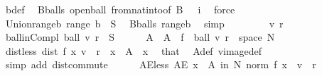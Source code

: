 \begin{isabellebody}
\ b{\isacharunderscore}{\kern0pt}def\ \isamarkupfalse%
\ B{\isacharunderscore}{\kern0pt}balls\ open{\isacharunderscore}{\kern0pt}ball\ from{\isacharunderscore}{\kern0pt}nat{\isacharunderscore}{\kern0pt}into{\isacharbrackleft}{\kern0pt}of\ {\isachardoublequoteopen}B\ {\isasymunion}\ {\isacharbraceleft}{\kern0pt}{\isacharbraceleft}{\kern0pt}{\isacharbraceright}{\kern0pt}{\isacharbraceright}{\kern0pt}{\isachardoublequoteclose}\ i{\isacharbrackright}{\kern0pt}\ \isamarkupfalse%
\ force\isanewline
\ \ \isamarkupfalse%
\ Union{\isacharunderscore}{\kern0pt}range{\isacharunderscore}{\kern0pt}b{\isacharcolon}{\kern0pt}\ {\isachardoublequoteopen}{\isasymUnion}{\isacharparenleft}{\kern0pt}range\ b{\isacharparenright}{\kern0pt}\ {\isacharequal}{\kern0pt}\ {\isacharminus}{\kern0pt}S{\isachardoublequoteclose}\ \isamarkupfalse%
\ B{\isacharunderscore}{\kern0pt}balls\ range{\isacharunderscore}{\kern0pt}b\ \isamarkupfalse%
\ simp\isanewline
\isanewline
\ \ \isacommand{{\isacharbraceleft}{\kern0pt}}\isamarkupfalse%
\isanewline
\ \ \ \ \isamarkupfalse%
\ v\ r\ \isamarkupfalse%
\ ball{\isacharunderscore}{\kern0pt}in{\isacharunderscore}{\kern0pt}Compl{\isacharcolon}{\kern0pt}\ {\isachardoublequoteopen}ball\ v\ r\ {\isasymsubseteq}\ {\isacharminus}{\kern0pt}S{\isachardoublequoteclose}\isanewline
\ \ \ \ \isamarkupfalse%
\ A\ \ {\isachardoublequoteopen}A\ {\isacharequal}{\kern0pt}\ f\ {\isacharminus}{\kern0pt}{\isacharbackquote}{\kern0pt}\ ball\ v\ r\ {\isasyminter}\ space\ N{\isachardoublequoteclose}\isanewline
\ \ \ \ \isamarkupfalse%
\ dist{\isacharunderscore}{\kern0pt}less{\isacharcolon}{\kern0pt}\ {\isachardoublequoteopen}dist\ {\isacharparenleft}{\kern0pt}f\ x{\isacharparenright}{\kern0pt}\ v\ {\isacharless}{\kern0pt}\ r{\isachardoublequoteclose}\ \ {\isachardoublequoteopen}x\ {\isasymin}\ A{\isachardoublequoteclose}\ \ x\ \isamarkupfalse%
\ that\ \isamarkupfalse%
\ A{\isacharunderscore}{\kern0pt}def\ vimage{\isacharunderscore}{\kern0pt}def\ \isamarkupfalse%
\ {\isacharparenleft}{\kern0pt}simp\ add{\isacharcolon}{\kern0pt}\ dist{\isacharunderscore}{\kern0pt}commute{\isacharparenright}{\kern0pt}\isanewline
\ \ \ \ \isamarkupfalse%
\ AE{\isacharunderscore}{\kern0pt}less{\isacharcolon}{\kern0pt}\ {\isachardoublequoteopen}AE\ x\ {\isasymin}\ A\ in\ N{\isachardot}{\kern0pt}\ norm\ {\isacharparenleft}{\kern0pt}f\ x\ {\isacharminus}{\kern0pt}\ v{\isacharparenright}{\kern0pt}\ {\isacharless}{\kern0pt}\ r{\isachardoublequoteclose}\ \isamarkupfalse%

\end{isabellebody}
